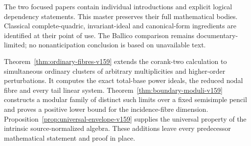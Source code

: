 The two focused papers contain individual introductions and explicit
logical dependency statements. This master preserves their full
mathematical bodies. Classical complete-quadric, invariant-ideal and
canonical-form ingredients are identified at their point of use.
The Ballico comparison \cite{Ballico93} remains documentary-limited;
no nonanticipation conclusion is based on unavailable text.

Theorem~\ref{thm:ordinary-fibres-v159} extends the corank-two calculation
to simultaneous ordinary clusters of arbitrary multiplicities and
higher-order perturbations. It computes the exact total-base power
ideals, the reduced nodal fibre and every tail linear system.
Theorem~\ref{thm:boundary-moduli-v159} constructs a modular family of
distinct such limits over a fixed semisimple pencil and proves a
positive lower bound for the incidence-fibre dimension.
Proposition~\ref{prop:universal-envelope-v159} supplies the universal
property of the intrinsic source-normalized algebra. These additions
leave every predecessor mathematical statement and proof in place.


